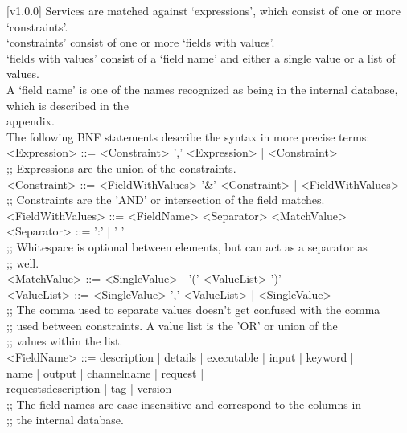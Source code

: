 [v1.0.0]
%
Services are matched against `expressions', which consist of one or more
`constraints'.\\
`constraints' consist of one or more `fields with values'.\\
`fields with values' consist of a `field name' and either a single value or a list of
values.\\
A `field name' is one of the names recognized as being in the internal database, which is
described in the\\
 appendix.\\

The following BNF statements describe the syntax in more precise terms:
\outputBegin{}
<Expression> ::= <Constraint> ',' <Expression> | <Constraint>\\
;; Expressions are the union of the constraints.\\

<Constraint> ::= <FieldWithValues> '\&' <Constraint> | <FieldWithValues>\\
;; Constraints are the 'AND' or intersection of the field matches.\\

<FieldWithValues> ::= <FieldName> <Separator> <MatchValue>\\
<Separator> ::= ':' | ' '\\
;; Whitespace is optional between elements, but can act as a separator as\\
;; well.\\

<MatchValue> ::= <SingleValue> | '(' <ValueList> ')'\\
<ValueList> ::= <SingleValue> ',' <ValueList> | <SingleValue>\\
;; The comma used to separate values doesn't get confused with the comma\\
;; used between constraints. A value list is the 'OR' or union of the\\
;; values within the list.\\

\settowidth{\utilLen}{<FieldName> ::= }%
<FieldName> ::= description | details | executable | input | keyword |\\
\hspace*{\utilLen}name | output | channelname | request |\\
\hspace*{\utilLen}requestsdescription | tag | version\\
;; The field names are case-insensitive and correspond to the columns in\\
;; the internal database.\\

